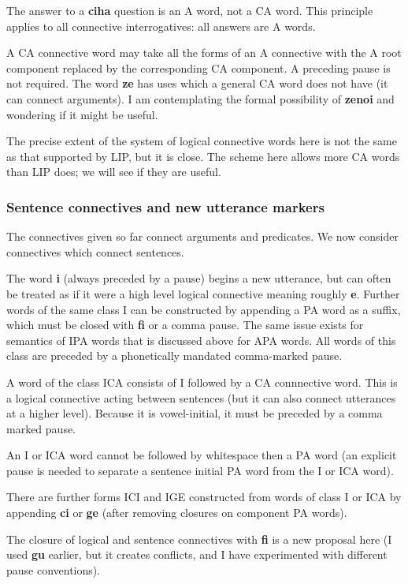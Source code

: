 \documentclass[12pt]{book}
\begin{document}
{The answer to a {\bf ciha} question is an A word, not a CA word.  This principle applies to all connective interrogatives:  all answers are A words.

A CA connective word may take all the forms of an A connective with the A root component replaced by the corresponding CA component.   A preceding pause is not required.  The word {\bf ze} has uses which a general CA word does not have (it can connect arguments).  I am contemplating the formal possibility of {\bf zenoi} and wondering if it might be useful.  

The precise extent of the system of logical connective words here is not the same as that supported by LIP, but it is close.  The scheme here allows more CA words than LIP does; we will see if they are useful.

\subsubsection{Sentence connectives and new utterance markers}

The connectives given so far connect arguments and predicates.   We now consider connectives which connect sentences.

The word {\bf i} (always preceded by a pause) begins a new utterance, but can often be treated as if it were a high level logical connective meaning roughly {\bf e}.  Further words of the same class I can be constructed by appending a PA word as a suffix, which must be closed with {\bf fi} or a comma pause.  The same issue exists for semantics of IPA words that is discussed above for APA words.   All words of this class are preceded by a phonetically mandated comma-marked pause.

A word of the class ICA consists of I followed by a CA connnective word.   This is a logical connective acting between sentences (but it can also connect utterances at a higher level).   Because it is vowel-initial, it must be preceded
by a comma marked pause.

An I or ICA word cannot be followed by whitespace then a PA word (an explicit pause is needed to separate a sentence initial PA word from the I or ICA word).

There are further forms ICI and IGE constructed from words of class I or ICA  by appending {\bf ci} or {\bf ge} (after removing closures on component PA words).

The closure of logical and sentence connectives with {\bf fi} is a new proposal here (I used {\bf gu} earlier, but it creates conflicts, and I have experimented with different pause conventions).

}
\end{document}
